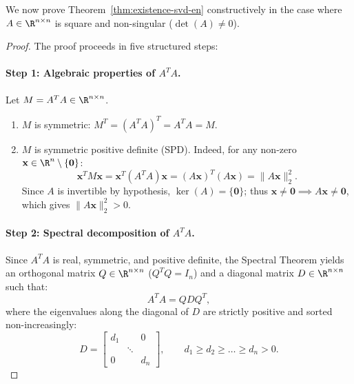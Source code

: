 We now prove Theorem~\ref{thm:existence-svd-en} constructively in the case where $A \in \R^{n \times n}$ is square and non-singular ($\det(A) \neq 0$).

\begin{proof}
The proof proceeds in five structured steps:

\paragraph{Step 1: Algebraic properties of $A^T A$.}
Let $M = A^T A \in \R^{n \times n}$.
\begin{enumerate}
    \item $M$ is symmetric: $M^T = (A^T A)^T = A^T A = M$.
    \item $M$ is symmetric positive definite (SPD). Indeed, for any non-zero $\mathbf{x} \in \R^n \setminus \{\mathbf{0}\}$:
    \begin{equation}
        \mathbf{x}^T M \mathbf{x} = \mathbf{x}^T (A^T A) \mathbf{x} = (A\mathbf{x})^T (A\mathbf{x}) = \|A\mathbf{x}\|_2^2.
    \end{equation}
    Since $A$ is invertible by hypothesis, $\ker(A) = \{\mathbf{0}\}$; thus $\mathbf{x} \neq \mathbf{0} \implies A\mathbf{x} \neq \mathbf{0}$, which gives $\|A\mathbf{x}\|_2^2 > 0$.
\end{enumerate}

\paragraph{Step 2: Spectral decomposition of $A^T A$.}
Since $A^T A$ is real, symmetric, and positive definite, the Spectral Theorem yields an orthogonal matrix $Q \in \R^{n \times n}$ ($Q^T Q = I_n$) and a diagonal matrix $D \in \R^{n \times n}$ such that:
\begin{equation}
    A^T A = Q D Q^T,
\end{equation}
where the eigenvalues along the diagonal of $D$ are strictly positive and sorted non-increasingly:
\begin{equation}
    D = \begin{bmatrix}
        d_1 & & 0 \\
        & \ddots & \\
        0 & & d_n
    \end{bmatrix}, \qquad d_1 \ge d_2 \ge \dots \ge d_n > 0.
\end{equation}


\end{proof}
